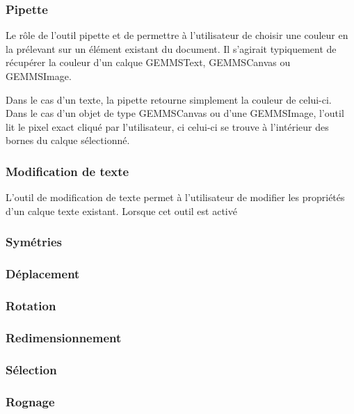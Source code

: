 \subsubsection{Pipette}
Le rôle de l'outil pipette et de permettre à l'utilisateur de choisir une couleur en la prélevant sur un élément existant du document. Il s'agirait typiquement de récupérer la couleur d'un calque GEMMSText, GEMMSCanvas ou GEMMSImage.
\par 
Dans le cas d'un texte, la pipette retourne simplement la couleur de celui-ci. Dans le cas d'un objet de type GEMMSCanvas ou d'une GEMMSImage, l'outil lit le pixel exact cliqué par l'utilisateur, ci celui-ci se trouve à l'intérieur des bornes du calque sélectionné.
\subsubsection{Modification de texte}
L'outil de modification de texte permet à l'utilisateur de modifier les propriétés d'un calque texte existant. Lorsque cet outil est activé
\subsubsection{Symétries}
\subsubsection{Déplacement}
\subsubsection{Rotation}
\subsubsection{Redimensionnement}
\subsubsection{Sélection}
\subsubsection{Rognage}




